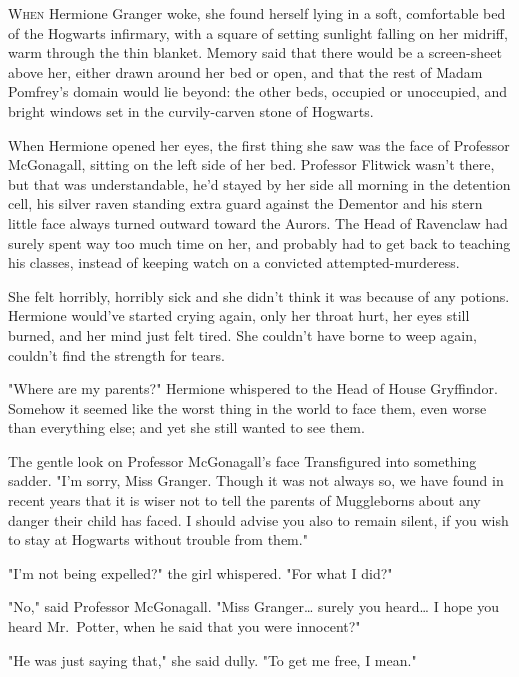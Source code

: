 
\label{ch-TabooTradeoffsAftermathII}

\lettrine{W}{hen} Hermione
Granger woke, she found herself lying in a soft, comfortable bed of the
Hogwarts infirmary, with a square of setting sunlight falling on her midriff,
warm through the thin blanket. Memory said that there would be a screen-sheet
above her, either drawn around her bed or open, and that the rest of Madam
Pomfrey's domain would lie beyond: the other beds, occupied or unoccupied, and
bright windows set in the curvily-carven stone of Hogwarts.

When Hermione opened her eyes, the first thing she saw was the face of
Professor McGonagall, sitting on the left side of her bed. Professor Flitwick
wasn't there, but that was understandable, he'd stayed by her side all morning
in the detention cell, his silver raven standing extra guard against the
Dementor and his stern little face always turned outward toward the Aurors. The
Head of Ravenclaw had surely spent way too much time on her, and probably had
to get back to teaching his classes, instead of keeping watch on a convicted
attempted-murderess.

She felt horribly, horribly sick and she didn't think it was because of any
potions. Hermione would've started crying again, only her throat hurt, her eyes
still burned, and her mind just felt tired. She couldn't have borne to weep
again, couldn't find the strength for tears.

"Where are my parents?" Hermione whispered to the Head of House Gryffindor.
Somehow it seemed like the worst thing in the world to face them, even worse
than everything else; and yet she still wanted to see them.

The gentle look on Professor McGonagall's face Transfigured into something
sadder. "I'm sorry, Miss Granger. Though it was not always so, we have found in
recent years that it is wiser not to tell the parents of Muggleborns about any
danger their child has faced. I should advise you also to remain silent, if you
wish to stay at Hogwarts without trouble from them."

"I'm not being expelled?" the girl whispered. "For what I did?"

"No," said Professor McGonagall. "Miss Granger{\ldots} surely you heard{\ldots}
I hope you heard Mr.~Potter, when he said that you were innocent?"

"He was just saying that," she said dully. "To get me free, I mean."

